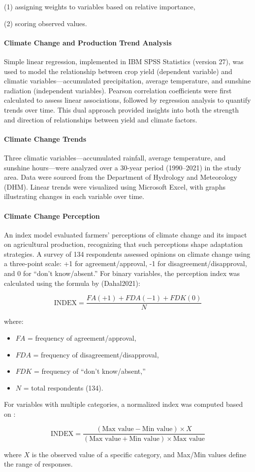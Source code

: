 (1) assigning weights to variables based on relative importance, 

(2) scoring observed values.

\paragraph{Climate Change and Production Trend Analysis}  
Simple linear regression, implemented in IBM SPSS Statistics (version 27), was used to model the relationship between crop yield (dependent variable) and climatic variables---accumulated precipitation, average temperature, and sunshine radiation (independent variables). Pearson correlation coefficients were first calculated to assess linear associations, followed by regression analysis to quantify trends over time. This dual approach provided insights into both the strength and direction of relationships between yield and climate factors.

\paragraph{Climate Change Trends}  
Three climatic variables---accumulated rainfall, average temperature, and sunshine hours---were analyzed over a 30-year period (1990--2021) in the study area. Data were sourced from the Department of Hydrology and Meteorology (DHM). Linear trends were visualized using Microsoft Excel, with graphs illustrating changes in each variable over time.

\paragraph{Climate Change Perception}  
An index model evaluated farmers’ perceptions of climate change and its impact on agricultural production, recognizing that such perceptions shape adaptation strategies. A survey of 134 respondents assessed opinions on climate change using a three-point scale: +1 for agreement/approval, -1 for disagreement/disapproval, and 0 for “don’t know/absent.” For binary variables, the perception index was calculated using the formula by (Dahal2021):

\[
\text{INDEX} = \frac{FA(+1) + FDA(-1) + FDK(0)}{N}
\]

where:
\begin{itemize}
    \item $FA$ = frequency of agreement/approval,
    \item $FDA$ = frequency of disagreement/disapproval,
    \item $FDK$ = frequency of “don’t know/absent,”
    \item $N$ = total respondents (134).
\end{itemize}

For variables with multiple categories, a normalized index was computed based on \parencite{Banerjee_stat_techniques_2023}:

\[
\text{INDEX} = \frac{(\text{Max value} - \text{Min value}) \times X}{(\text{Max value} + \text{Min value}) \times \text{Max value}}
\]

where $X$ is the observed value of a specific category, and Max/Min values define the range of responses.

